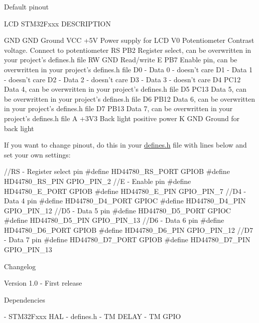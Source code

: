\begin{DoxyParagraph}{Default pinout}

\end{DoxyParagraph}
\begin{DoxyVerb}LCD   STM32Fxxx         DESCRIPTION

GND   GND               Ground
VCC   +5V               Power supply for LCD
V0    Potentiometer     Contrast voltage. Connect to potentiometer
RS    PB2               Register select, can be overwritten in your project's defines.h file
RW    GND               Read/write
E     PB7               Enable pin, can be overwritten in your project's defines.h file
D0    -                 Data 0 - doesn't care
D1    -                 Data 1 - doesn't care
D2    -                 Data 2 - doesn't care
D3    -                 Data 3 - doesn't  care
D4    PC12              Data 4, can be overwritten in your project's defines.h file
D5    PC13              Data 5, can be overwritten in your project's defines.h file
D6    PB12              Data 6, can be overwritten in your project's defines.h file
D7    PB13              Data 7, can be overwritten in your project's defines.h file
A     +3V3              Back light positive power
K     GND               Ground for back light
\end{DoxyVerb}


If you want to change pinout, do this in your \hyperlink{defines_8h}{defines.\+h} file with lines below and set your own settings\+:


\begin{DoxyCode}
\textcolor{comment}{//RS - Register select pin}
\textcolor{preprocessor}{#define HD44780\_RS\_PORT     GPIOB}
\textcolor{preprocessor}{#define HD44780\_RS\_PIN      GPIO\_PIN\_2}
\textcolor{comment}{//E - Enable pin}
\textcolor{preprocessor}{#define HD44780\_E\_PORT      GPIOB}
\textcolor{preprocessor}{#define HD44780\_E\_PIN       GPIO\_PIN\_7}
\textcolor{comment}{//D4 - Data 4 pin}
\textcolor{preprocessor}{#define HD44780\_D4\_PORT     GPIOC}
\textcolor{preprocessor}{#define HD44780\_D4\_PIN      GPIO\_PIN\_12}
\textcolor{comment}{//D5 - Data 5 pin}
\textcolor{preprocessor}{#define HD44780\_D5\_PORT     GPIOC}
\textcolor{preprocessor}{#define HD44780\_D5\_PIN      GPIO\_PIN\_13}
\textcolor{comment}{//D6 - Data 6 pin}
\textcolor{preprocessor}{#define HD44780\_D6\_PORT     GPIOB}
\textcolor{preprocessor}{#define HD44780\_D6\_PIN      GPIO\_PIN\_12}
\textcolor{comment}{//D7 - Data 7 pin}
\textcolor{preprocessor}{#define HD44780\_D7\_PORT     GPIOB}
\textcolor{preprocessor}{#define HD44780\_D7\_PIN      GPIO\_PIN\_13}
\end{DoxyCode}


\begin{DoxyParagraph}{Changelog}

\end{DoxyParagraph}
\begin{DoxyVerb} Version 1.0
  - First release
\end{DoxyVerb}


\begin{DoxyParagraph}{Dependencies}

\end{DoxyParagraph}
\begin{DoxyVerb} - STM32Fxxx HAL
 - defines.h
 - TM DELAY
 - TM GPIO
\end{DoxyVerb}
 